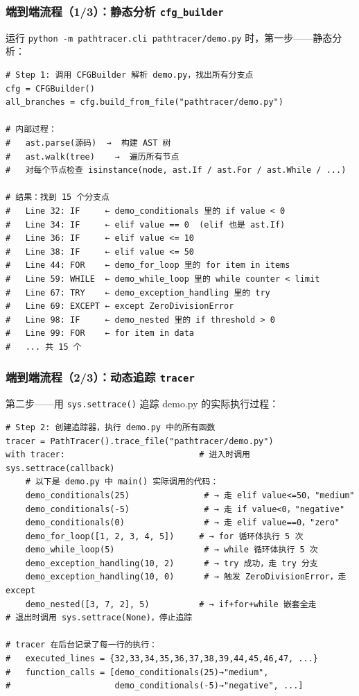 \documentclass[presentation,aspectratio=169]{ctexbeamer}
\begin{document}
\begin{frame}[fragile]
\frametitle{端到端流程（1/3）：静态分析 \texttt{cfg\_builder}}
{\scriptsize 运行 \texttt{python -m pathtracer.cli pathtracer/demo.py} 时，第一步——静态分析：}

\vspace{0.05cm}
{\tiny
\begin{verbatim}
# Step 1: 调用 CFGBuilder 解析 demo.py，找出所有分支点
cfg = CFGBuilder()
all_branches = cfg.build_from_file("pathtracer/demo.py")

# 内部过程：
#   ast.parse(源码)  →  构建 AST 树
#   ast.walk(tree)    →  遍历所有节点
#   对每个节点检查 isinstance(node, ast.If / ast.For / ast.While / ...)

# 结果：找到 15 个分支点
#   Line 32: IF     ← demo_conditionals 里的 if value < 0
#   Line 34: IF     ← elif value == 0  (elif 也是 ast.If)
#   Line 36: IF     ← elif value <= 10
#   Line 38: IF     ← elif value <= 50
#   Line 44: FOR    ← demo_for_loop 里的 for item in items
#   Line 59: WHILE  ← demo_while_loop 里的 while counter < limit
#   Line 67: TRY    ← demo_exception_handling 里的 try
#   Line 69: EXCEPT ← except ZeroDivisionError
#   Line 98: IF     ← demo_nested 里的 if threshold > 0
#   Line 99: FOR    ← for item in data
#   ... 共 15 个
\end{verbatim}}
\end{frame}


\begin{frame}[fragile]
\frametitle{端到端流程（2/3）：动态追踪 \texttt{tracer}}
{\scriptsize 第二步——用 \texttt{sys.settrace()} 追踪 demo.py 的实际执行过程：}

\vspace{0.05cm}
{\tiny
\begin{verbatim}
# Step 2: 创建追踪器，执行 demo.py 中的所有函数
tracer = PathTracer().trace_file("pathtracer/demo.py")
with tracer:                           # 进入时调用 sys.settrace(callback)
    # 以下是 demo.py 中 main() 实际调用的代码：
    demo_conditionals(25)               # → 走 elif value<=50，"medium"
    demo_conditionals(-5)               # → 走 if value<0，"negative"
    demo_conditionals(0)                # → 走 elif value==0，"zero"
    demo_for_loop([1, 2, 3, 4, 5])     # → for 循环体执行 5 次
    demo_while_loop(5)                  # → while 循环体执行 5 次
    demo_exception_handling(10, 2)      # → try 成功，走 try 分支
    demo_exception_handling(10, 0)      # → 触发 ZeroDivisionError，走 except
    demo_nested([3, 7, 2], 5)          # → if+for+while 嵌套全走
# 退出时调用 sys.settrace(None)，停止追踪

# tracer 在后台记录了每一行的执行：
#   executed_lines = {32,33,34,35,36,37,38,39,44,45,46,47, ...}
#   function_calls = [demo_conditionals(25)→"medium",
#                     demo_conditionals(-5)→"negative", ...]
\end{verbatim}}
\end{frame}
\end{document}
